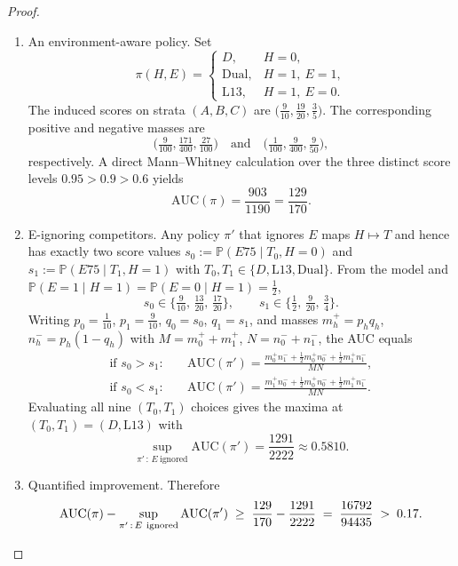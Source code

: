 \begin{proof}
\begin{enumerate}
\item An environment-aware policy. Set
\[
\pi(H,E)=\begin{cases}
D,& H=0,\\
\mathrm{Dual},& H=1,\ E=1,\\
\mathrm{L13},& H=1,\ E=0.
\end{cases}
\]
The induced scores on strata $(A,B,C)$ are $\big(\tfrac{9}{10},\tfrac{19}{20},\tfrac{3}{5}\big)$. The corresponding positive and negative masses are
\[
\big(\tfrac{9}{100},\tfrac{171}{400},\tfrac{27}{100}\big)\quad\text{and}\quad\big(\tfrac{1}{100},\tfrac{9}{400},\tfrac{9}{50}\big),
\]
respectively. A direct Mann--Whitney calculation over the three distinct score levels $0.95>0.9>0.6$ yields
\[
\mathrm{AUC}(\pi)=\frac{903}{1190}=\frac{129}{170}.
\]

\item E-ignoring competitors. Any policy $\pi'$ that ignores $E$ maps $H\mapsto T$ and hence has exactly two score values $s_0:=\mathbb P(E75\mid T_0,H=0)$ and $s_1:=\mathbb P(E75\mid T_1,H=1)$ with $T_0,T_1\in\{D,\mathrm{L13},\mathrm{Dual}\}$. From the model and $\mathbb P(E=1\mid H=1)=\mathbb P(E=0\mid H=1)=\tfrac12$,
\[
 s_0\in\Big\{\tfrac{9}{10},\,\tfrac{13}{20},\,\tfrac{17}{20}\Big\},\qquad s_1\in\Big\{\tfrac12,\,\tfrac{9}{20},\,\tfrac34\Big\}.
\]
Writing $p_0=\tfrac{1}{10}$, $p_1=\tfrac{9}{10}$, $q_0=s_0$, $q_1=s_1$, and masses $m_h^+=p_h q_h$, $n_h^-=p_h(1-q_h)$ with $M=m_0^++m_1^+$, $N=n_0^-+n_1^-$, the AUC equals
\[
\begin{aligned}
\text{if } s_0>s_1:\quad &\mathrm{AUC}(\pi')
=\frac{m_0^+n_1^-+\tfrac12 m_0^+n_0^-+\tfrac12 m_1^+n_1^-}{MN},\\
\text{if } s_0<s_1:\quad &\mathrm{AUC}(\pi')
=\frac{m_1^+n_0^-+\tfrac12 m_0^+n_0^-+\tfrac12 m_1^+n_1^-}{MN}.
\end{aligned}
\]
Evaluating all nine $(T_0,T_1)$ choices gives the maxima at $(T_0,T_1)=(D,\mathrm{L13})$ with
\[
\sup_{\pi'\,:\,E\ \text{ignored}}\mathrm{AUC}(\pi')=\frac{1291}{2222}\approx0.5810.
\]

\item Quantified improvement. Therefore
\[
\mathrm{AUC}(\pi)-\sup_{\pi'\,:\,E\ \text{ignored}}\mathrm{AUC}(\pi')\;\ge\;\frac{129}{170}-\frac{1291}{2222}\;=\;\frac{16792}{94435}\;>\;0.17.\qedhere
\]
\end{enumerate}
\end{proof}
